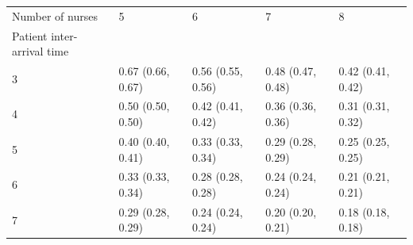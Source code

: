 \begin{tabular}{lllll}
\toprule
Number of nurses & 5 & 6 & 7 & 8 \\
Patient inter-arrival time &  &  &  &  \\
\midrule
3 & 0.67 (0.66, 0.67) & 0.56 (0.55, 0.56) & 0.48 (0.47, 0.48) & 0.42 (0.41, 0.42) \\
4 & 0.50 (0.50, 0.50) & 0.42 (0.41, 0.42) & 0.36 (0.36, 0.36) & 0.31 (0.31, 0.32) \\
5 & 0.40 (0.40, 0.41) & 0.33 (0.33, 0.34) & 0.29 (0.28, 0.29) & 0.25 (0.25, 0.25) \\
6 & 0.33 (0.33, 0.34) & 0.28 (0.28, 0.28) & 0.24 (0.24, 0.24) & 0.21 (0.21, 0.21) \\
7 & 0.29 (0.28, 0.29) & 0.24 (0.24, 0.24) & 0.20 (0.20, 0.21) & 0.18 (0.18, 0.18) \\
\bottomrule
\end{tabular}
